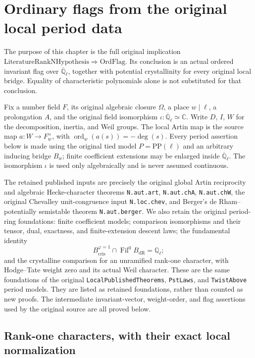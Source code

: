 \section{Ordinary flags from the original local period data}
\label{sec:ordinary-flags-v44}

The purpose of this chapter is the full original implication
\(\mathrm{LiteratureRankNHypothesis}\Rightarrow\mathrm{OrdFlag}\).
Its conclusion is an actual ordered invariant flag over
\(\overline{\mathbb Q}_\ell\), together with potential crystallinity
for every original local bridge.  Equality of characteristic
polynomials alone is not substituted for that conclusion.

Fix a number field \(F\), its original algebraic closure \(\Omega\),
a place \(w\mid\ell\), a prolongation \(A\), and the original
field isomorphism \(\iota:\overline{\mathbb Q}_\ell\simeq\mathbb C\).
Write \(D\), \(I\), \(W\) for the decomposition, inertia, and Weil
groups.  The local Artin map is the source map
\(a:W\to F_w^\times\), with
\(\operatorname{ord}_w(a(s))=-\deg(s)\).
Every period assertion below is made using the original tied model
\(P=\mathrm{PP}(\ell)\) and an arbitrary inducing bridge
\(B_w\); finite coefficient extensions may be enlarged inside
\(\overline{\mathbb Q}_\ell\).  The isomorphism \(\iota\) is used
only algebraically and is never assumed continuous.

The retained published inputs are precisely the original global Artin
reciprocity and algebraic Hecke-character theorems
\texttt{N.aut.art}, \texttt{N.aut.chA}, \texttt{N.aut.chW}, the
original Chevalley unit-congruence input \texttt{N.loc.chev}, and
Berger's de Rham--potentially semistable theorem
\texttt{N.aut.berger}.  We also retain the original period-ring
foundations: finite coefficient models; comparison isomorphisms and
their tensor, dual, exactness, and finite-extension descent laws;
the fundamental identity
\[
 B_{\mathrm{cris}}^{\varphi=1}\cap
             \operatorname{Fil}^0B_{\mathrm{dR}}=\mathbb Q_\ell;
 \tag{OFL.1}
\]
and the crystalline comparison for an unramified rank-one character,
with Hodge--Tate weight zero and its actual Weil character.
These are the same foundations of the original \texttt{LocalPublishedTheorems},
\texttt{PstLaws}, and \texttt{TwistAbove} period models.  They are
listed as retained foundations, rather than counted as new proofs.
The intermediate invariant-vector, weight-order, and flag assertions
used by the original source are all proved below.

\subsection{Rank-one characters, with their exact local normalization}


